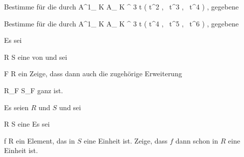 \setcounter{section}{19}







{}
{





Bestimme
für die durch
\maabbeledisp {} { {\mathbb A}^{1}_{ K } } { { {\mathbb A}_{ K }^{  3   } }
} { t } { \left( t^2  , \,  t^3  , \,  t^4                 \right)
} {,}
gegebene





}
{} {}

{}
{





Bestimme
für die durch
\maabbeledisp {} { {\mathbb A}^{1}_{ K } } { { {\mathbb A}_{ K }^{  3   } }
} { t } { \left( t^4  , \,  t^5  , \,  t^6                 \right)
} {,}
gegebene





}
{} {}

{}
{





Es sei

\mavergleichskette
{\vergleichskette
{R
}
{ \subseteq }{ S
}
{  }{
}
{    }{
}
{   }{
}
}
{}{}{}
eine
von
und sei

\mavergleichskette
{\vergleichskette
{F
}
{ \subseteq }{ R
}
{  }{
}
{    }{
}
{   }{
}
}
{}{}{}
ein
Zeige, dass dann auch die zugehörige Erweiterung

\mavergleichskette
{\vergleichskette
{R_F
}
{ \subseteq }{ S_F
}
{  }{
}
{    }{
}
{   }{
}
}
{}{}{}
ganz ist.





}
{} {}

{}
{





Es seien $R$ und $S$
und sei

\mavergleichskette
{\vergleichskette
{R
}
{ \subseteq }{ S
}
{  }{
}
{    }{
}
{   }{
}
}
{}{}{}
eine
Es sei

\mavergleichskette
{\vergleichskette
{f
}
{ \in }{ R
}
{  }{
}
{    }{
}
{   }{
}
}
{}{}{}
ein Element, das in $S$ eine Einheit ist. Zeige, dass $f$ dann schon in $R$ eine Einheit ist.





}
{} {}

